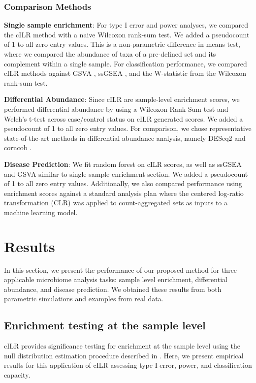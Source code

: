 \documentclass{article}
\begin{document}
\subsubsection*{Comparison Methods}

\noindent \textbf{Single sample enrichment}: For type I error and power analyses, we compared the cILR method with a naive Wilcoxon rank-sum test. We added a pseudocount of 1 to all zero entry values. This is a non-parametric difference in means test, where we compared the abundance of taxa of a pre-defined set and its complement within a single sample. For classification performance, we compared cILR methods against GSVA \cite{hanzelmann2013}, ssGSEA \cite{barbie2009}, and the W-statistic from the Wilcoxon rank-sum test.

\noindent \textbf{Differential Abundance}: Since cILR are sample-level enrichment scores, we performed differential abundance by using a Wilcoxon Rank Sum test and Welch's t-test across case/control status on cILR generated scores. We added a pseudocount of 1 to all zero entry values. For comparison, we chose representative state-of-the-art methods in differential abundance analysis, namely DESeq2 \cite{love2014,mcmurdie2014} and corncob \cite{martin2020}. 

\noindent \textbf{Disease Prediction}: We fit random forest on cILR scores, as well as ssGSEA \cite{hanzelmann2013} and GSVA \cite{barbie2009} similar to single sample enrichment section. We added a pseudocount of 1 to all zero entry values. Additionally, we also compared performance using enrichment scores against a standard analysis plan where the centered log-ratio transformation (CLR) was applied to count-aggregated sets as inputs to a machine learning model.  

\section*{Results}
In this section, we present the performance of our proposed method for three applicable microbiome analysis tasks: sample level enrichment, differential abundance, and disease prediction. We obtained these results from both parametric simulations and examples from real data.  

\subsection*{Enrichment testing at the sample level}
cILR provides significance testing for enrichment at the sample level using the null distribution estimation procedure described in . Here, we present empirical results for this application of cILR assessing type I error, power, and classification capacity. 
\end{document}
